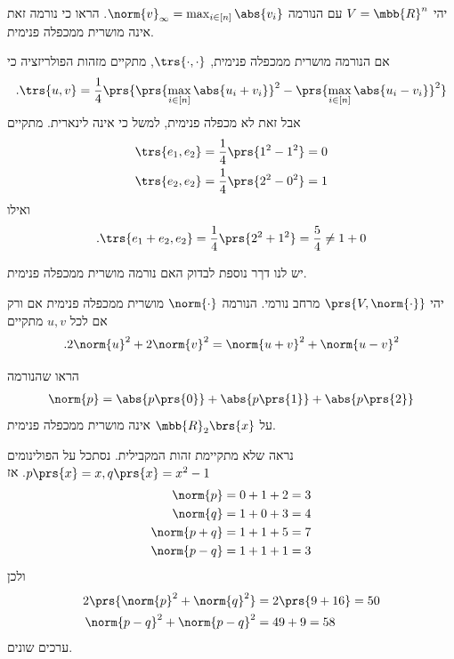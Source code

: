 \documentclass[a4paper,10pt,twoside,openany]{book}
\begin{document}
\begin{exercisechap}
יהי
$V = \mbb{R}^n$
עם הנורמה
$\norm{v}_{\infty} = \max_{i \in [n]} \abs{v_i}$.
הראו כי נורמה זאת אינה מושרית ממכפלה פנימית.
\end{exercisechap}

\begin{solution}
אם הנורמה מושרית ממכפלה פנימית,
$\trs{\cdot, \cdot}$,
מתקיים מזהות הפולריזציה כי
\[\text{.} \trs{u,v} = \frac{1}{4} \prs{\prs{\max_{i \in [n]} \abs{u_i + v_i}}^2 - \prs{\max_{i \in [n]} \abs{u_i - v_i}}^2}\]
אבל זאת לא מכפלה פנימית, למשל כי אינה לינארית.
מתקיים
\begin{align*}
\trs{e_1, e_2} &= \frac{1}{4} \prs{1^2 - 1^2} = 0 \\
\trs{e_2, e_2} &= \frac{1}{4} \prs{2^2 - 0^2} = 1
\end{align*}
ואילו
\[\text{.} \trs{e_1 + e_2, e_2} = \frac{1}{4} \prs{2^2 + 1^2} = \frac{5}{4} \neq 1 + 0\]
\end{solution}

יש לנו דךר נוספת לבדוק האם נורמה מושרית ממכפלה פנימית.

\begin{theorem}
יהי
$\prs{V, \norm{\cdot}}$
מרחב נורמי. הנורמה
$\norm{\cdot}$
מושרית ממכפלה פנימית אם ורק אם לכל
$u,v$
מתקיים
\[\text{.} 2 \norm{u}^2 + 2 \norm{v}^2 = \norm{u+v}^2 + \norm{u-v}^2\]
\end{theorem}

\begin{exercisechap}
הראו שהנורמה
\begin{align*}
\norm{p} = \abs{p\prs{0}} + \abs{p\prs{1}} + \abs{p\prs{2}}
\end{align*}
על
$\mbb{R}_2\brs{x}$
אינה מושרית ממכפלה פנימית.
\end{exercisechap}

\begin{solution}
נראה שלא מתקיימת זהות המקבילית.
נסתכל על הפולינומים
$p\prs{x} = x, q\prs{x} = x^2 - 1$.
אז
\begin{align*}
\norm{p} &= 0+1+2 = 3 \\
\norm{q} &= 1 + 0 + 3 = 4 \\
\norm{p+q} &= 1 + 1 + 5 = 7 \\
\norm{p-q} &= 1 + 1 + 1 = 3
\end{align*}
ולכן
\begin{align*}
2 \prs{\norm{p}^2 + \norm{q}^2} &= 2 \prs{9 + 16} = 50 \\
\norm{p-q}^2 + \norm{p-q}^2 &= 49 + 9 = 58
\end{align*}
ערכים שונים.
\end{solution}
\end{document}

